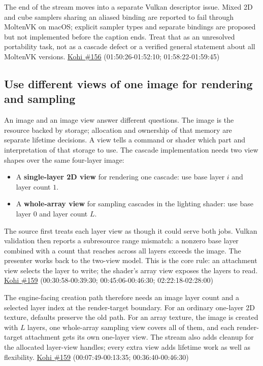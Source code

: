 The end of the stream moves into a separate Vulkan descriptor issue. Mixed 2D and cube samplers sharing an aliased binding are reported to fail through MoltenVK on macOS; explicit sampler types and separate bindings are proposed but not implemented before the caption ends. Treat that as an unresolved portability task, not as a cascade defect or a verified general statement about all MoltenVK versions. \href{https://www.youtube.com/watch?v=coWS_saBPBk}{Kohi \#156} (01:50:26-01:52:10; 01:58:22-01:59:45)

\subsection{Use different views of one image for rendering and sampling}\label{06-engine-ii-ch026-use-different-views-of-one-image-for-rendering-and-sampling}

An image and an image view answer different questions. The image is the resource backed by storage; allocation and ownership of that memory are separate lifetime decisions. A view tells a command or shader which part and interpretation of that storage to use. The cascade implementation needs two view shapes over the same four-layer image:

\begin{itemize}
\tightlist
\item
  A \textbf{single-layer 2D view} for rendering one cascade: use base layer \(i\) and layer count \(1\).
\item
  A \textbf{whole-array view} for sampling cascades in the lighting shader: use base layer \(0\) and layer count \(L\).
\end{itemize}

The source first treats each layer view as though it could serve both jobs. Vulkan validation then reports a subresource range mismatch: a nonzero base layer combined with a count that reaches across all layers exceeds the image. The presenter works back to the two-view model. This is the core rule: an attachment view selects the layer to write; the shader's array view exposes the layers to read. \href{https://www.youtube.com/watch?v=FrtHF-9K1HI}{Kohi \#159} (00:30:58-00:39:30; 00:45:06-00:46:30; 02:22:18-02:28:00)

The engine-facing creation path therefore needs an image layer count and a selected layer index at the render-target boundary. For an ordinary one-layer 2D texture, defaults preserve the old path. For an array texture, the image is created with \(L\) layers, one whole-array sampling view covers all of them, and each render-target attachment gets its own one-layer view. The stream also adds cleanup for the allocated layer-view handles; every extra view adds lifetime work as well as flexibility. \href{https://www.youtube.com/watch?v=FrtHF-9K1HI}{Kohi \#159} (00:07:49-00:13:35; 00:36:40-00:46:30)


